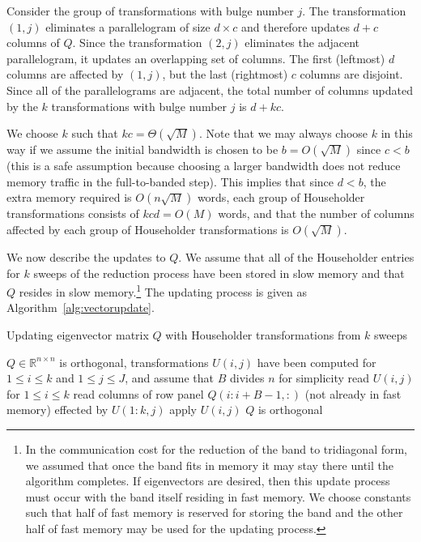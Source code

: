 \documentclass{article}
\theoremstyle{definition}
\begin{document}
Consider the group of transformations with bulge number $j$.  The transformation $(1,j)$ eliminates a parallelogram of size $d\times c$ and therefore updates $d+c$ columns of $Q$.  Since the transformation $(2,j)$ eliminates the adjacent parallelogram, it updates an overlapping set of columns.  The first (leftmost) $d$ columns are affected by $(1,j)$, but the last (rightmost) $c$ columns are disjoint.  Since all of the parallelograms are adjacent, the total number of columns updated by the $k$ transformations with bulge number $j$ is $d+kc$.

We choose $k$ such that $kc=\Theta(\sqrt M)$.  Note that we may always choose $k$ in this way if we assume the initial bandwidth is chosen to be $b=O(\sqrt M)$ since $c<b$ (this is a safe assumption because choosing a larger bandwidth does not reduce memory traffic in the full-to-banded step).  This implies that since $d<b$, the extra memory required is $O(n\sqrt M)$ words, each group of Householder transformations consists of $kcd=O(M)$ words, and that the number of columns affected by each group of Householder transformations is $O(\sqrt M)$.

We now describe the updates to $Q$.  We assume that all of the Householder entries for $k$ sweeps of the reduction process have been stored in slow memory and that $Q$ resides in slow memory.\footnote{In the communication cost for the reduction of the band to tridiagonal form, we assumed that once the band fits in memory it may stay there until the algorithm completes.  If eigenvectors are desired, then this update process must occur with the band itself residing in fast memory.  We choose constants such that half of fast memory is reserved for storing the band and the other half of fast memory may be used for the updating process.}  The updating process is given as Algorithm~\ref{alg:vectorupdate}.   

\begin{algorithm}
\protect\caption{Updating eigenvector matrix $Q$ with Householder transformations from $k$ sweeps}
\label{alg:vectorupdate}
\begin{algorithmic}[1]
\REQUIRE $Q\in\mathbb{R}^{n\times n}$ is orthogonal, transformations $U(i,j)$ have been computed for $1\leq i\leq k$ and $1\leq j\leq J$, and assume that $B$ divides $n$ for simplicity
			\STATE read $U(i,j)$ for $1\leq i\leq k$
			\STATE read columns of row panel $Q(i:i+B-1,:)$ (not already in fast memory) effected by $U(1:k,j)$ 
				\STATE apply $U(i,j)$
			\ENDFOR
		\ENDFOR 
	\ENDFOR
\ENSURE $Q$ is orthogonal
\end{algorithmic}
\end{algorithm}
\end{document}
